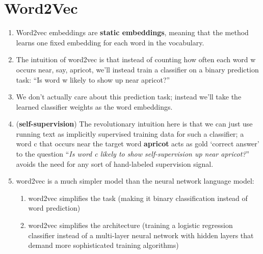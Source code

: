 \chapter{Word2Vec \cite{nlp-1}}

\begin{enumerate}
    \item Word2vec embeddings are \textbf{static embeddings}, meaning that the method learns one fixed embedding for each word in the vocabulary.
    
    \item The intuition of word2vec is that instead of counting how often each word w occurs near, say, apricot, we’ll instead train a classifier on a binary prediction task: “Is word w likely to show up near apricot?” 
    
    \item We don’t actually care about this prediction task; instead we’ll take the learned classifier weights as the word embeddings.

    \item (\textbf{self-supervision}) The revolutionary intuition here is that we can just use running text as implicitly supervised training data for such a classifier; a word c that occurs near the target word \textbf{apricot} acts as gold ‘correct answer’ to the question “\textit{Is word c likely to show self-supervision up near apricot?}”\\
    avoids the need for any sort of hand-labeled supervision signal.

    \item word2vec is a much simpler model than the neural network language model:
    \begin{enumerate}
        \item word2vec simplifies the task (making it binary classification instead of word prediction)

        \item word2vec simplifies the architecture (training a logistic regression classifier instead of a multi-layer neural network with hidden layers that demand more sophisticated training algorithms)
    \end{enumerate}
\end{enumerate}

